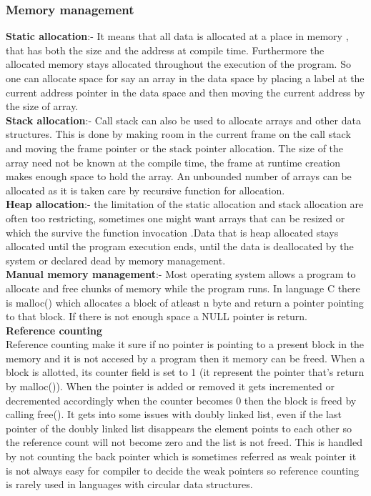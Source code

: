 \documentclass[23pt]{article}
\begin{document}
\subsubsection{Memory management}
{\Large \textbf{Static allocation}:- It means that all data is allocated at a place in memory , that has both the size and the address at compile time. Furthermore the allocated memory stays allocated throughout the execution of the program. So one can allocate space for say an array in the data space by placing a label at the current address pointer in the data space and then moving the current address by the size of array. \\
\textbf{Stack allocation}:- Call stack can also be used to allocate arrays and other data structures. This is done by making room in the current frame on the call stack and moving the frame pointer or the stack pointer allocation. The size of the array need not be known at the compile time, the frame at runtime creation makes enough space to hold the array. An unbounded number of arrays can be allocated as it is taken care by recursive function for allocation. \\ 
\textbf{Heap allocation}:- the limitation of the static allocation and stack allocation are often too restricting, sometimes one might want arrays that can be resized or which the survive the function invocation .Data that is heap allocated stays allocated until the program execution ends, until the data is deallocated by the system or declared dead by memory management. \\
\textbf{Manual memory management}:- Most operating system allows a program to allocate and free chunks of memory while the program runs. In language C there is malloc() which allocates a block of atleast n byte and return a pointer pointing to that block. If there is not enough space a NULL pointer is return. \\ 
\textbf{Reference counting} \\
Reference counting make it sure if no pointer is pointing to a present block in the memory and it is not accesed by a program then it memory can be freed. When a block is allotted, its counter field is set to 1 (it represent the pointer that’s return by malloc()). When the pointer is added or removed it gets incremented or decremented accordingly when the counter becomes 0 then the block is freed by calling free(). It gets into some issues with doubly linked list, even if the last pointer of the doubly linked list disappears the element points to each other so the reference count will not become zero and the list is not freed. This is handled by not counting the back pointer which is sometimes referred as weak pointer it is not always easy for compiler to decide the weak pointers so reference counting is rarely used in languages with circular data structures.
}
\end{document}
